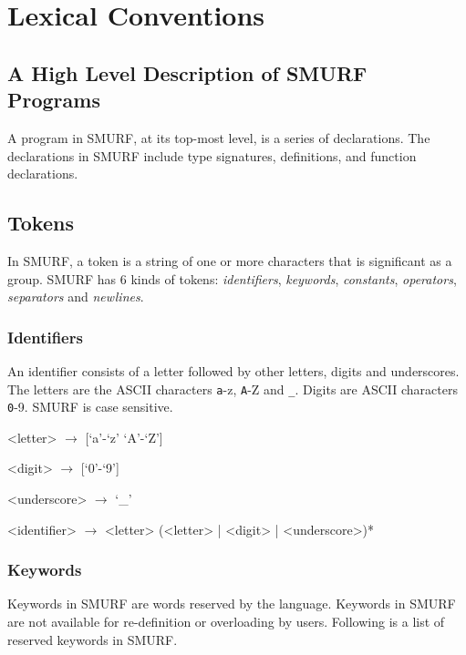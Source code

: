 \section{Lexical Conventions}
\subsection{A High Level Description of SMURF Programs}
A program in SMURF, at its top-most level, is a series of declarations. The declarations in SMURF include type signatures, definitions, and function declarations.

\subsection{Tokens}
In SMURF, a token is a string of one or more characters that is significant as a group.
SMURF has 6 kinds of tokens: {\it identifiers}, {\it keywords}, {\it constants},
      {\it operators},
{\it separators} and {\it newlines}.

\subsubsection{Identifiers}
\label{sec:identifiers}
An identifier consists of a letter followed by other letters, 
digits and underscores. The letters are the ASCII characters {\texttt a-z}, {\texttt A-Z} and \texttt{\_}. Digits are ASCII
characters {\texttt 0-9}. SMURF is case sensitive.

\begin{grammar}
<letter> $\rightarrow$ [`a'-`z' `A'-`Z'] 

<digit> $\rightarrow$ [`0'-`9'] 

<underscore> $\rightarrow$ {`_'} 

<identifier> $\rightarrow$ <letter> (<letter> | <digit> | <underscore>)*
\end{grammar}

\subsubsection{Keywords}
\label{sec:keywords}
Keywords in SMURF are words reserved by the language. Keywords in SMURF are not available for
re-definition or overloading by users. Following is a list of reserved keywords in SMURF. 

